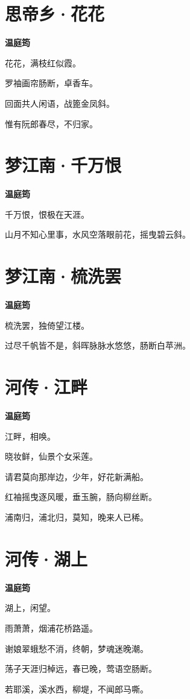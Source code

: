 \documentclass[12pt,a4paper]{ctexbook}
\begin{document}
\section{思帝乡·花花}
\textbf{温庭筠}\par\vspace{0.5em}
花花，满枝红似霞。\par
罗袖画帘肠断，卓香车。\par
回面共人闲语，战篦金凤斜。\par
惟有阮郎春尽，不归家。\par

\section{梦江南·千万恨}
\textbf{温庭筠}\par\vspace{0.5em}
千万恨，恨极在天涯。\par
山月不知心里事，水风空落眼前花，摇曳碧云斜。\par

\section{梦江南·梳洗罢}
\textbf{温庭筠}\par\vspace{0.5em}
梳洗罢，独倚望江楼。\par
过尽千帆皆不是，斜晖脉脉水悠悠，肠断白苹洲。\par

\section{河传·江畔}
\textbf{温庭筠}\par\vspace{0.5em}
江畔，相唤。\par
晓妆鲜，仙景个女采莲。\par
请君莫向那岸边，少年，好花新满船。\par
红袖摇曳逐风暖，垂玉腕，肠向柳丝断。\par
浦南归，浦北归，莫知，晚来人已稀。\par

\section{河传·湖上}
\textbf{温庭筠}\par\vspace{0.5em}
湖上，闲望。\par
雨萧萧，烟浦花桥路遥。\par
谢娘翠蛾愁不消，终朝，梦魂迷晚潮。\par
荡子天涯归棹远，春已晚，莺语空肠断。\par
若耶溪，溪水西，柳堤，不闻郎马嘶。\par
\end{document}

